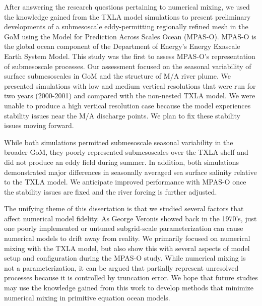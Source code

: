 After answering the research questions pertaining to numerical mixing, we used the knowledge gained from the TXLA model simulations to present preliminary developments of a submesoscale eddy-permitting regionally refined mesh in the GoM using the Model for Prediction Across Scales Ocean (MPAS-O). MPAS-O is the global ocean component of the Department of Energy's Energy Exascale Earth System Model. This study was the first to assess MPAS-O's representation of submesoscale processes. Our assessment focused on the seasonal variability  of surface submesoscales in GoM and the structure of M/A river plume. We presented simulations with low and medium vertical resolutions that were run for two years (2000-2001) and compared with the non-nested TXLA model. We were unable to produce a high vertical resolution case because the model experiences stability issues near the M/A discharge points. We plan to fix these stability issues moving forward. 

While both simulations permitted submesoscale seasonal variability in the broader GoM, they poorly represented submesoscales over the TXLA shelf and did not produce an eddy field during summer. In addition, both simulations demonstrated major differences in seasonally averaged sea surface salinity relative to the TXLA model. We anticipate improved performance with MPAS-O once the stability issues are fixed and the river forcing is further adjusted. 

The unifying theme of this dissertation is that we studied several factors that affect numerical model fidelity. As George Veronis showed back in the 1970's, just one poorly implemented or untuned subgrid-scale parameterization can cause numerical models to drift away from reality. We primarily focused on numerical mixing with the TXLA model, but also show this with several aspects of model setup and configuration during the MPAS-O study. While numerical mixing is not a parameterization, it can be argued that partially represent unresolved processes because it is controlled by truncation error. We hope that future studies may use the knowledge gained from this work to develop methods that minimize numerical mixing in primitive equation ocean models. 


